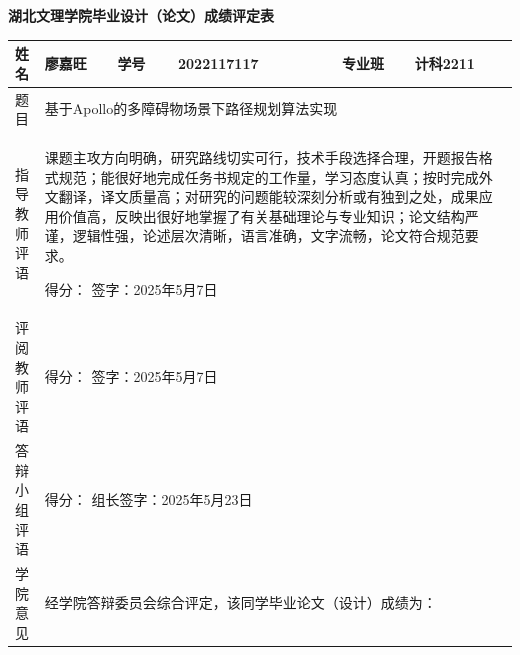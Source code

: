 \documentclass[a4paper,12pt]{article}
\begin{document}
\begin{center}
{\Large\bfseries 湖北文理学院毕业设计（论文）成绩评定表}
\end{center}

\vspace{6pt}

\begin{tabular}{|p{1.2cm}|p{2.2cm}|p{1.2cm}|p{2.5cm}|p{1.5cm}|p{5.06cm}|}
\hline
姓名 & 廖嘉旺 & 学号 & 2022117117 & 专业班 & 计科2211 \\
\hline
题目 & \multicolumn{5}{l|}{基于Apollo的多障碍物场景下路径规划算法实现} \\
\hline
\makecell{指\\导\\教\\师\\评\\语} & \multicolumn{5}{p{13.46cm}|}{
\vspace{4pt}
课题主攻方向明确，研究路线切实可行，技术手段选择合理，开题报告格式规范；能很好地完成任务书规定的工作量，学习态度认真；按时完成外文翻译，译文质量高；对研究的问题能较深刻分析或有独到之处，成果应用价值高，反映出很好地掌握了有关基础理论与专业知识；论文结构严谨，逻辑性强，论述层次清晰，语言准确，文字流畅，论文符合规范要求。
\vspace{8pt}

得分：\hspace{2cm} 签字：\hfill 2025年5月7日\hspace{0.5cm}
\vspace{2pt}
} \\
\hline
\makecell{评\\阅\\教\\师\\评\\语} & \multicolumn{5}{p{13.46cm}|}{
\vspace{40pt}

得分：\hspace{2cm} 签字：\hfill 2025年5月7日\hspace{0.5cm}
\vspace{2pt}
} \\
\hline
\makecell{答\\辩\\小\\组\\评\\语} & \multicolumn{5}{p{13.46cm}|}{
\vspace{40pt}

得分：\hspace{2cm} 组长签字：\hfill 2025年5月23日\hspace{0.5cm}
\vspace{2pt}
} \\
\hline
\makecell{学\\院\\意\\见} & \multicolumn{5}{p{13.46cm}|}{
\vspace{2pt}
经学院答辩委员会综合评定，该同学毕业论文（设计）成绩为：
\vspace{12pt}

}
\end{tabular}
\end{document}
